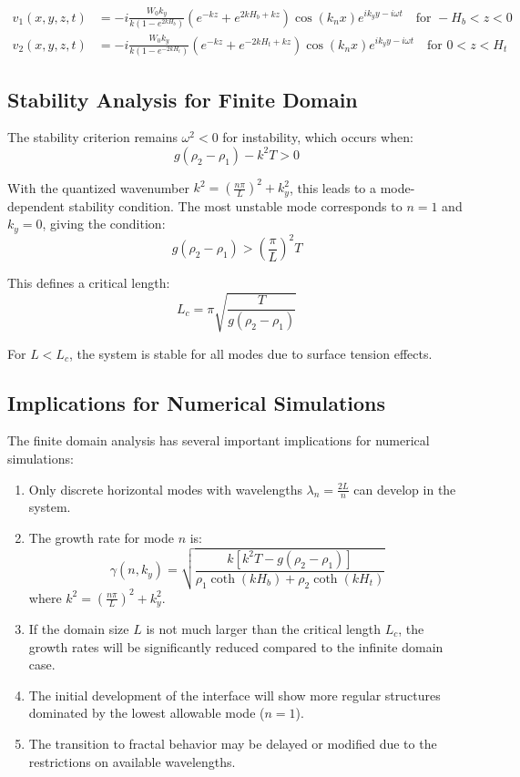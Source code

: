 \documentclass[12pt,a4paper]{article}
\begin{document}
\begin{align}
v_1(x,y,z,t) &= -i\frac{W_0 k_y}{k(1-e^{2kH_b})}(e^{-kz}+e^{2kH_b+kz})\cos(k_n x)e^{ik_y y-i\omega t} \quad \text{for } -H_b < z < 0 \\
v_2(x,y,z,t) &= -i\frac{W_0 k_y}{k(1-e^{-2kH_t})}(e^{-kz}+e^{-2kH_t+kz})\cos(k_n x)e^{ik_y y-i\omega t} \quad \text{for } 0 < z < H_t
\end{align}

\subsection{Stability Analysis for Finite Domain}
The stability criterion remains $\omega^2 < 0$ for instability, which occurs when:
\begin{equation}
g(\rho_2 - \rho_1) - k^2T > 0
\end{equation}

With the quantized wavenumber $k^2 = \left(\frac{n\pi}{L}\right)^2 + k_y^2$, this leads to a mode-dependent stability condition. The most unstable mode corresponds to $n = 1$ and $k_y = 0$, giving the condition:
\begin{equation}
g(\rho_2 - \rho_1) > \left(\frac{\pi}{L}\right)^2 T
\end{equation}

This defines a critical length:
\begin{equation}
L_c = \pi\sqrt{\frac{T}{g(\rho_2 - \rho_1)}}
\end{equation}

For $L < L_c$, the system is stable for all modes due to surface tension effects.

\subsection{Implications for Numerical Simulations}
The finite domain analysis has several important implications for numerical simulations:

\begin{enumerate}
    \item Only discrete horizontal modes with wavelengths $\lambda_n = \frac{2L}{n}$ can develop in the system.
    \item The growth rate for mode $n$ is:
    \begin{equation}
    \gamma(n,k_y) = \sqrt{\frac{k[k^2T - g(\rho_2 - \rho_1)]}{\rho_1\coth(kH_b) + \rho_2\coth(kH_t)}}
    \end{equation}
    where $k^2 = \left(\frac{n\pi}{L}\right)^2 + k_y^2$.
    \item If the domain size $L$ is not much larger than the critical length $L_c$, the growth rates will be significantly reduced compared to the infinite domain case.
    \item The initial development of the interface will show more regular structures dominated by the lowest allowable mode ($n = 1$).
    \item The transition to fractal behavior may be delayed or modified due to the restrictions on available wavelengths.
\end{enumerate}
\end{document}
